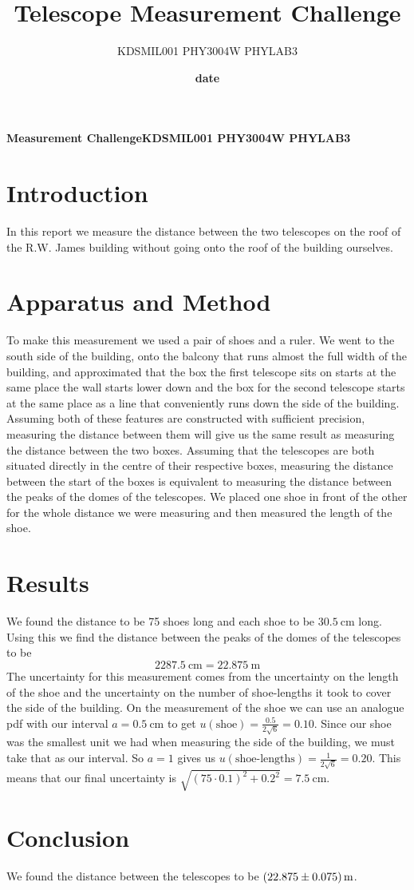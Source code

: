 \documentclass[12pt]{article}
\title{Telescope Measurement Challenge}
\author{KDSMIL001 \; PHY3004W PHYLAB3}
\date{\textbf{date}}
\numberwithin{equation}{section}
\numberwithin{figure}{section}
\numberwithin{table}{section}
\begin{document}
    \textbf{Measurement Challenge}\hspace{25pt}\textbf{KDSMIL001 \; PHY3004W PHYLAB3}

    \section{Introduction}\label{sec:Introduction}
    In this report we measure the distance between the two telescopes on the roof of the 
    R.W. James building without going onto the roof of the building ourselves. 

    \section{Apparatus and Method}\label{sec:Apparatus and Method}
    To make this measurement we used a pair of shoes and a ruler. We went to the south side 
    of the building, onto the balcony that runs almost the full width of the building, and 
    approximated that the box the first telescope sits on starts at the same place the wall 
    starts lower down and the box for the second telescope starts at the same place as a line 
    that conveniently runs down the side of the building. Assuming both of these features 
    are constructed with sufficient precision, measuring the distance between them will 
    give us the same result as measuring the distance between the two boxes. Assuming that 
    the telescopes are both situated directly in the centre of their respective boxes, 
    measuring the distance between the start of the boxes is equivalent to measuring the 
    distance between the peaks of the domes of the telescopes. \newline
    We placed one shoe in front of the other for the whole distance we were measuring and 
    then measured the length of the shoe. 

    \section{Results}\label{sec:Results}
    We found the distance to be 75 shoes long and each shoe to be $\SI{30.5}{\cm}$ long. 
    Using this we find the distance between the peaks of the domes of the telescopes to be 
    \begin{equation*}
        \SI{2287.5}{\cm}=\SI{22.875}{\metre}
    \end{equation*}
    The uncertainty for this measurement comes from the uncertainty on the length of the 
    shoe and the uncertainty on the number of shoe-lengths it took to cover the side of 
    the building. On the measurement of the shoe we can use an analogue pdf with our 
    interval $a=\SI{0.5}{\cm}$ to get $u(\text{shoe})=\frac{0.5}{2\sqrt{6}}=0.10$. Since 
    our shoe was the smallest unit we had when measuring the side of the building, we must 
    take that as our interval. So $a=1$ gives us 
    $u(\text{shoe-lengths})=\frac{1}{2\sqrt{6}}=0.20$. This means that our final uncertainty 
    is $\sqrt{(75\cdot 0.1)^2 + 0.2^2}=\SI{7.5}{\cm}$.

    \section{Conclusion}\label{sec:Conclusion}
    We found the distance between the telescopes to be $\SI{22.875\pm0.075}{\metre}$.
    
    
\end{document}
